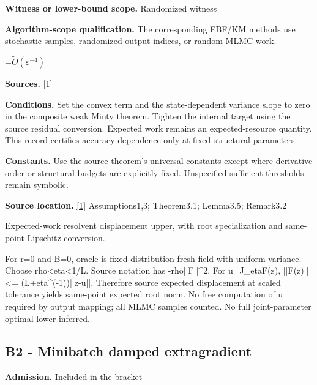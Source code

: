 \documentclass[10pt,a4paper]{article}
\newcommand{\AtlasMath}[1]{\par\begingroup\centering\setbox0=\hbox{$\displaystyle #1$}\ifdim\wd0>1.4\linewidth\typeout{ATLAS WIDE FORMULA: \the\wd0}\fi\ifdim\wd0>\linewidth\resizebox{\linewidth}{!}{\box0}\else\box0\fi\par\endgroup}
\begin{document}
\textbf{Witness or lower-bound scope.} Randomized witness



\textbf{Algorithm-scope qualification.} The corresponding FBF/KM methods use stochastic samples, randomized output indices, or random MLMC work.



\AtlasMath{\widetilde{O}(\varepsilon^{-4})}


\textbf{Sources.} \href{https://raw.githubusercontent.com/mlresearch/v306/main/assets/alacaoglu26a/alacaoglu26a.pdf}{[1]}



\textbf{Conditions.} Set the convex term and the state-dependent variance slope to zero in the composite weak Minty theorem. Tighten the internal target using the source residual conversion. Expected work remains an expected-resource quantity. This record certifies accuracy dependence only at fixed structural parameters.



\textbf{Constants.} Use the source theorem’s universal constants except where derivative order or structural budgets are explicitly fixed. Unspecified sufficient thresholds remain symbolic.



\textbf{Source location.} \href{https://raw.githubusercontent.com/mlresearch/v306/main/assets/alacaoglu26a/alacaoglu26a.pdf}{[1]} Assumptions1,3; Theorem3.1; Lemma3.5; Remark3.2



Expected-work resolvent displacement upper, with root specialization and same-point Lipschitz conversion.



For r=0 and B=0, oracle is fixed-distribution fresh field with uniform variance. Choose rho<eta<1/L. Source notation has -rho||F||\textasciicircum{}2. For u=J\_etaF(z), ||F(z)||<= (L+eta\textasciicircum{}(-1))||z-u||. Therefore source expected displacement at scaled tolerance yields same-point expected root norm. No free computation of u required by output mapping; all MLMC samples counted. No full joint-parameter optimal lower inferred.



\subsection{B2 - Minibatch damped extragradient}


\textbf{Admission.} Included in the bracket
\end{document}

